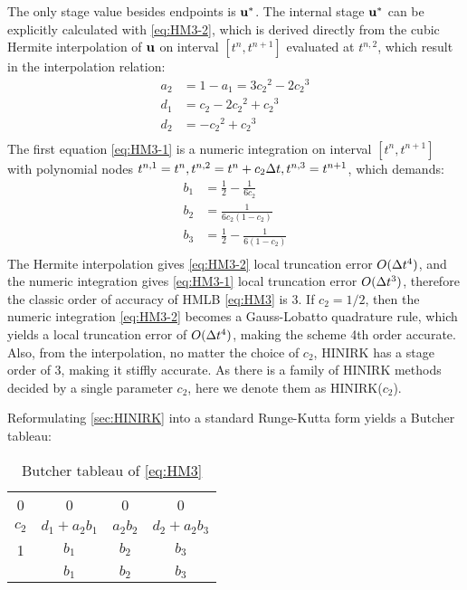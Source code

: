 \documentclass[preprint,12pt]{elsarticle}
\begin{document}
The only stage value besides endpoints is $\mathbf{u}^*$.
The internal stage $\mathbf{u}^*$ can be explicitly
calculated with \eqref{eq:HM3-2}, which is derived
directly from the cubic Hermite interpolation of $\mathbf{u}$
on interval $[t^n,t^{n+1}]$ evaluated at
$t^{n,2}$, which result in the interpolation relation:
\begin{equation}
    \begin{aligned}
        a_2 & = 1 - a_1 = 3{c_2}^2 - 2 {c_2}^3 \\
        d_1 & = {c_2} - 2 {c_2}^2 + {c_2}^3    \\
        d_2 & = - {c_2}^2 + {c_2}^3            \\
    \end{aligned}
    \label{eq:interp}
\end{equation}
The first equation \eqref{eq:HM3-1} is
a numeric integration on interval $[t^n,t^{n+1}]$ with
polynomial nodes
$t^{n,1}=t^n,t^{n,2}=t^n+c_2\mathrm\Delta t,t^{n,3}=t^{n+1}$, which demands:
\begin{equation}
    \begin{aligned}
        b_1 & = \frac{1}{2} - \frac{1}{6{c_2}}     \\
        b_2 & = \frac{1}{6{c_2}(1-{c_2})}          \\
        b_3 & = \frac{1}{2} - \frac{1}{6(1-{c_2})} \\
    \end{aligned}
    \label{eq:integ}
\end{equation}
The Hermite interpolation gives \eqref{eq:HM3-2}
local truncation error $O(\mathrm\Delta t^4)$,
and the numeric integration gives \eqref{eq:HM3-1}
local truncation error $O(\mathrm\Delta t^3)$, therefore the
classic order of accuracy of HMLB \eqref{eq:HM3} is
3. If $c_2=1/2$, then the numeric integration \eqref{eq:HM3-2}
becomes a Gauss-Lobatto quadrature rule, which yields
a local truncation error of $O(\mathrm\Delta t^4)$, making
the scheme 4th order accurate.
Also, from the interpolation, no matter
the choice of $c_2$, HINIRK has a stage order of
3, making it stiffly accurate.
As there is a family of HINIRK methods decided by
a single parameter $c_2$,
here we denote them as HINIRK($c_2$).


Reformulating \eqref{sec:HINIRK} into
a standard Runge-Kutta form yields a Butcher
tableau:
\begin{table}[htbp]
    \centering
    \begin{tabular}{c|ccc}
        0     & 0              & 0        & 0              \\
        $c_2$ & $d_1 + a_2b_1$ & $a_2b_2$ & $d_2 + a_2b_3$ \\
        1     & $b_1$          & $b_2$    & $b_3$          \\ \hline
              & $b_1$          & $b_2$    & $b_3$
    \end{tabular}
    \caption{Butcher tableau of \eqref{eq:HM3}}
    \label{tab:HM3Butcher}
\end{table}
\end{document}
